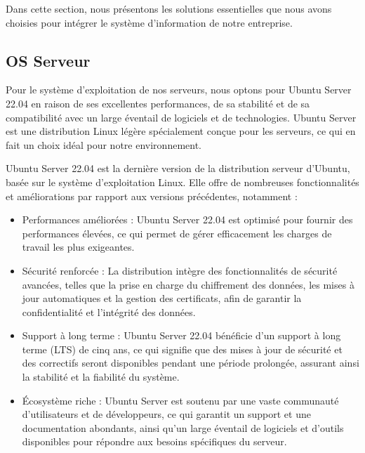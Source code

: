 Dans cette section, nous présentons les solutions essentielles que nous avons choisies pour intégrer le système d’information de notre entreprise.

\subsection{OS Serveur}

Pour le système d'exploitation de nos serveurs, nous optons pour Ubuntu Server 22.04 en raison de ses excellentes performances, de sa stabilité et de sa compatibilité avec un large éventail de logiciels et de technologies. Ubuntu Server est une distribution Linux légère spécialement conçue pour les serveurs, ce qui en fait un choix idéal pour notre environnement.

Ubuntu Server 22.04 est la dernière version de la distribution serveur d'Ubuntu, basée sur le système d'exploitation Linux. Elle offre de nombreuses fonctionnalités et améliorations par rapport aux versions précédentes, notamment :

\begin{itemize}

\item Performances améliorées : Ubuntu Server 22.04 est optimisé pour fournir des performances élevées, ce qui permet de gérer efficacement les charges de travail les plus exigeantes. \\

\item Sécurité renforcée : La distribution intègre des fonctionnalités de sécurité avancées, telles que la prise en charge du chiffrement des données, les mises à jour automatiques et la gestion des certificats, afin de garantir la confidentialité et l'intégrité des données.\\

\item Support à long terme : Ubuntu Server 22.04 bénéficie d'un support à long terme (LTS) de cinq ans, ce qui signifie que des mises à jour de sécurité et des correctifs seront disponibles pendant une période prolongée, assurant ainsi la stabilité et la fiabilité du système.\\

\item Écosystème riche : Ubuntu Server est soutenu par une vaste communauté d'utilisateurs et de développeurs, ce qui garantit un support et une documentation abondants, ainsi qu'un large éventail de logiciels et d'outils disponibles pour répondre aux besoins spécifiques du serveur.\\
\end{itemize}

